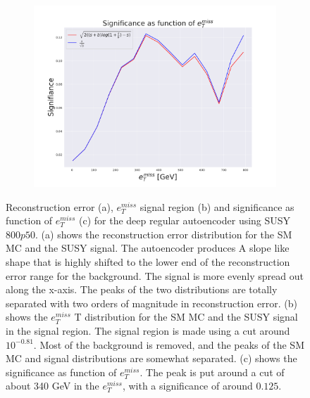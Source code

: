 \begin{figure}[H]
    \hfill  
    \begin{subfigure}{.40\textwidth}
        \includegraphics[width=\textwidth]{Figures/AE_testing/small/2lep/significance_etmiss_800p0p050_-0.805852780573614.pdf}
        \caption{}
        \label{fig:AE_2lep_small_signi_800_3}
    \end{subfigure}
    \hfill      
    \caption[2lep shallow network | $800p50$ | AE | 3]{Reconstruction error (a), $e_T^{miss}$ signal region (b) and significance as function of 
    $e_T^{miss}$ (c) for the deep regular autoencoder using SUSY $800p50$. 
    (a) shows the reconstruction error distribution for the SM MC and the SUSY signal. 
    The autoencoder produces A slope like shape that is highly shifted to the lower end of the reconstruction error range
for the background. The signal is more evenly spread out along the x-axis. The peaks of the two distributions are totally separated
with two orders of magnitude in reconstruction error. (b) shows the $e_T^{miss}$
T distribution for the SM MC and the SUSY signal in the signal region. The signal region is made using a cut around
$10^{-0.81}$. Most of the background is removed, and the peaks of the SM MC and signal distributions are
somewhat separated. (c) shows the significance as function of $e_T^{miss}$. The peak is put 
around a cut of about 340 GeV in the $e_T^{miss}$, with a significance of around $0.125$.}
    \label{fig:AE_2lep_small_rec_sig_signi_800_3}
\end{figure}















